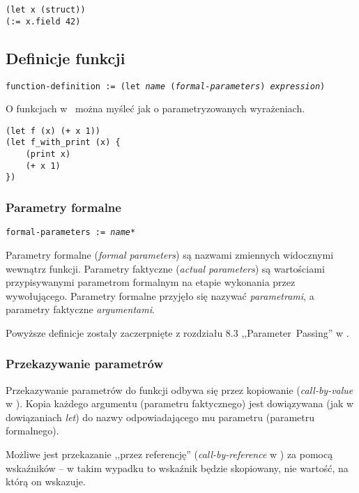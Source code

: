 \begin{lstlisting}
(let x (struct))
(:= x.field 42)
\end{lstlisting}

\subsection{Definicje funkcji}

\texttt{function-definition := (let \emph{name} (\emph{formal-parameters}) \emph{expression})}
\vspace{1em}

O funkcjach w \ViuAct\ można myśleć jak o parametryzowanych wyrażeniach.

\begin{lstlisting}
(let f (x) (+ x 1))
(let f_with_print (x) {
    (print x)
    (+ x 1)
})
\end{lstlisting}

\subsubsection{Parametry formalne}

\texttt{formal-parameters := \emph{name}*}
\vspace{1em}

Parametry formalne (\emph{formal parameters}) są nazwami zmiennych widocznymi
wewnątrz funkcji. Parametry faktyczne (\emph{actual parameters}) są wartościami
przypisywanymi parametrom formalnym na etapie wykonania przez wywołującego.
Parametry formalne przyjęło się nazywać \emph{parametrami}, a parametry
faktyczne \emph{argumentami}.

Powyższe definicje zostały zaczerpnięte z rozdziału 8.3 ,,Parameter~Passing'' w
\cite{ProgrammingLanguagePragmatics}.

\subsubsection{Przekazywanie parametrów}

Przekazywanie parametrów do funkcji odbywa się przez kopiowanie
(\emph{call-by-value} w \cite{ProgrammingLanguagePragmatics}). Kopia każdego
argumentu (parametru faktycznego) jest dowiązywana (jak w dowiązaniach
\emph{let}) do nazwy odpowiadającego mu parametru (parametru formalnego).

Możliwe jest przekazanie ,,przez referencję'' (\emph{call-by-reference} w
\cite{ProgrammingLanguagePragmatics}) za pomocą wskaźników -- w takim wypadku to
wskaźnik będzie skopiowany, nie wartość, na którą on wskazuje.

